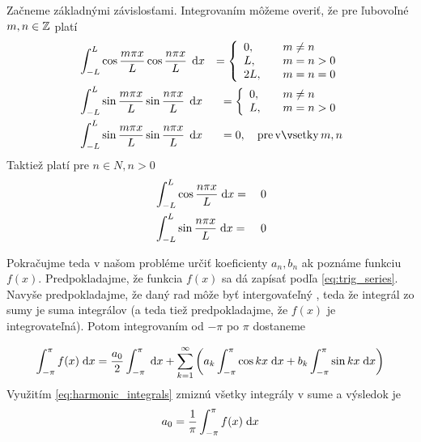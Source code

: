 Začneme základnými závislosťami. Integrovaním môžeme overiť, že pre
ľubovoľné $m,n \in \mathbb{Z}$ platí
\begin{eqnarray}
    &\displaystyle \intLL \cos \frac{m \pi x}{L} 
     \cos\frac{n \pi x}{L}\, \dd x &= 
     \left\{
        \begin{array}{l l}
            0,& \quad m\not=n \\
            L,& \quad m=n>0 \\
            2L,& \quad m=n=0
        \end{array}
     \right. \nonumber\\
    &\displaystyle \intLL \sin \frac{m \pi x}{L} 
     \sin\frac{n \pi x}{L}\, \dd x &= 
     \left\{
        \begin{array}{l l}
            0,& \quad m\not=n \\
            L,& \quad m=n > 0
        \end{array}    
     \right. \nonumber\\
    &\displaystyle \intLL \sin \frac{m \pi x}{L}
     \sin \frac{n \pi x}{L}\, \dd x &= 0,
        \quad {\rm pre\, všetky\,} m,n
        \label{eq:basic_orthogonality}
\end{eqnarray}
Taktiež platí pre $n \in N, n>0$
\begin{align}
    & \int_{-L}^{L} \cos \frac{n \pi x}{L} \; \mathrm{d} x = {}& 0 \nonumber \\
    & \int_{-L}^{L} \sin \frac{n \pi x}{L} \; \mathrm{d} x = {}& 0 
    \label{eq:harmonic_integrals}
\end{align}


Pokračujme teda v našom probléme určiť koeficienty $a_n,b_n$ ak
poznáme funkciu $f(x)$.
Predpokladajme, že funkcia $f(x)$ sa dá zapísať podľa
\ref{eq:trig_series}. Navyše predpokladajme, že daný rad môže byť
intergovaťeľný , teda že integrál zo sumy je suma
integrálov (a teda tiež predpokladajme, že $f(x)$ je integrovateľná).
Potom integrovaním od $-\pi$ po $\pi$ dostaneme


\begin{equation}
    \int_{-\pi}^{\pi} f(x) \; \mathrm{d} x = \frac{a_0}{2} \int_{-\pi}^{\pi} \; \mathrm{d} x +
        \sum_{k=1}^{\infty} \left( 
            a_k \int_{-\pi}^{\pi} \cos kx  \; \mathrm{d} x +
            b_k \int_{-\pi}^{\pi} \sin kx  \; \mathrm{d} x
        \right)
\end{equation}
Využitím \ref{eq:harmonic_integrals} zmiznú všetky integrály v sume a
výsledok je
\begin{equation}
   a_0 = \frac{1}{\pi} \int_{-\pi}^{\pi} f(x) \; \mathrm{d} x 
\end{equation}

